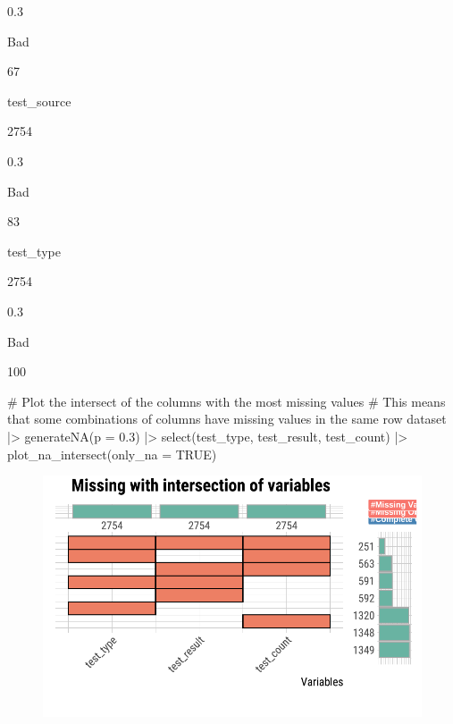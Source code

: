 \documentclass[
  letterpaper,
  DIV=11,
  numbers=noendperiod]{scrreprt}
\newenvironment{Shaded}{\begin{snugshade}}{\end{snugshade}}
\newcommand{\AttributeTok}[1]{\textcolor[rgb]{0.40,0.45,0.13}{#1}}
\newcommand{\CommentTok}[1]{\textcolor[rgb]{0.37,0.37,0.37}{#1}}
\newcommand{\ConstantTok}[1]{\textcolor[rgb]{0.56,0.35,0.01}{#1}}
\newcommand{\FloatTok}[1]{\textcolor[rgb]{0.68,0.00,0.00}{#1}}
\newcommand{\FunctionTok}[1]{\textcolor[rgb]{0.28,0.35,0.67}{#1}}
\newcommand{\NormalTok}[1]{\textcolor[rgb]{0.00,0.23,0.31}{#1}}
\newcommand{\SpecialCharTok}[1]{\textcolor[rgb]{0.37,0.37,0.37}{#1}}
\begin{document}
0.3

Bad

67

test\_source

2754

0.3

Bad

83

test\_type

2754

0.3

Bad

100

\begin{Shaded}
\begin{Highlighting}[]
\CommentTok{\# Plot the intersect of the columns with the most missing values}
\CommentTok{\# This means that some combinations of columns have missing values in the same row}
\NormalTok{dataset }\SpecialCharTok{|\textgreater{}}
  \FunctionTok{generateNA}\NormalTok{(}\AttributeTok{p =} \FloatTok{0.3}\NormalTok{) }\SpecialCharTok{|\textgreater{}}
  \FunctionTok{select}\NormalTok{(test\_type, test\_result, test\_count) }\SpecialCharTok{|\textgreater{}}
  \FunctionTok{plot\_na\_intersect}\NormalTok{(}\AttributeTok{only\_na =} \ConstantTok{TRUE}\NormalTok{) }
\end{Highlighting}
\end{Shaded}

\begin{figure}[H]

{\centering \includegraphics{./DiagnosingLikeDataDoctor_files/figure-pdf/unnamed-chunk-8-1.pdf}

}

\end{figure}
\end{document}
